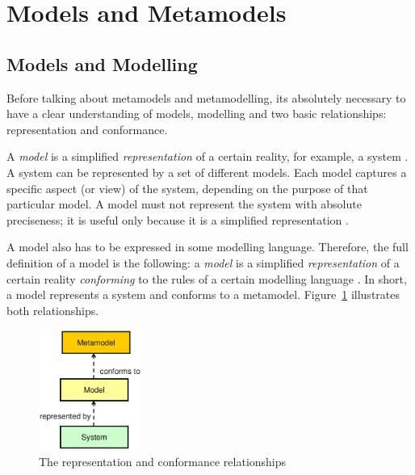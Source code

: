 \section{Models and Metamodels}

\subsection{Models and Modelling}

Before talking about metamodels and metamodelling, its absolutely necessary to have a clear understanding of models, modelling and two basic relationships: representation and conformance. 

A \textit{model} is a simplified \textit{representation} of a certain reality, for example, a system \cite{Genova09}.
A system can be represented by a set of different models.
Each model captures a specific aspect (or view) of the system, depending on the purpose of that particular model.
A model must not represent the system with absolute preciseness; it is useful only because it is a simplified representation \cite{Genova09}.

A model also has to be expressed in some modelling language.
Therefore, the full definition of a model is the following: a \textit{model} is a simplified \textit{representation} of a certain reality \textit{conforming} to the rules of a certain modelling language \cite{Genova09}. In short, a model represents a system and conforms to a metamodel. Figure~\ref{figure:representation-and-conformance} illustrates both relationships.

\begin{figure}[h]
	\centering
	\includegraphics[width=0.3\textwidth]{images/representation-and-conformance-relationships}
	\caption{The representation and conformance relationships \cite{Genova09}}
	\label{figure:representation-and-conformance}
\end{figure}

